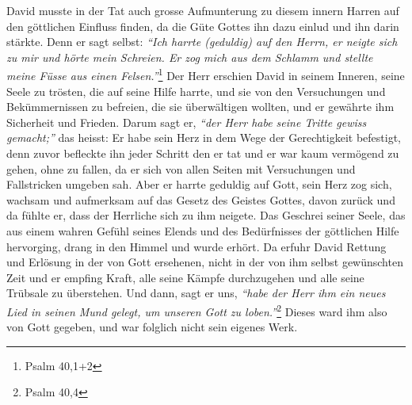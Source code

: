 David  musste in der Tat auch grosse Aufmunterung zu
diesem innern Harren
auf den göttlichen Einfluss finden, da die Güte Gottes ihn dazu einlud und ihn
darin stärkte. Denn er sagt selbst:
\textit{"`Ich harrte (geduldig) auf den Herrn,
er neigte sich zu mir und hörte mein Schreien. Er zog mich aus dem Schlamm und
stellte meine Füsse aus einen Felsen."'}\footnote{Psalm 40,1+2}
Der Herr
erschien David in seinem Inneren, seine Seele zu trösten, die auf
seine Hilfe
harrte, und sie von den Versuchungen und Bekümmernissen zu befreien, die sie
überwältigen wollten, und er gewährte ihm Sicherheit und Frieden. Darum sagt er,
\textit{"`der Herr habe seine Tritte gewiss gemacht;"'}
das heisst: Er habe sein Herz in
dem Wege der Gerechtigkeit befestigt, denn zuvor befleckte ihn jeder Schritt den
er tat und er war kaum vermögend zu gehen, ohne zu fallen, da er sich von
allen Seiten mit Versuchungen und Fallstricken umgeben sah. Aber er harrte
geduldig auf Gott, sein Herz zog sich, wachsam und aufmerksam auf das Gesetz des
Geistes Gottes, davon zurück und da fühlte er, dass der Herrliche sich zu ihm
neigete. Das Geschrei seiner Seele, das aus einem
wahren Gefühl seines Elends
und des Bedürfnisses der göttlichen Hilfe hervorging, drang in den Himmel und
wurde erhört. Da erfuhr David Rettung und Erlösung in der von Gott ersehenen,
nicht in der von ihm selbst gewünschten Zeit und er empfing Kraft, alle seine
Kämpfe durchzugehen und alle seine Trübsale zu überstehen. Und dann, sagt er
uns,
\textit{"`habe der Herr ihm ein neues Lied in seinen Mund gelegt, um unseren
Gott
zu loben."'}\footnote{Psalm 40,4}
Dieses ward ihm also von Gott gegeben, und war
folglich nicht sein eigenes Werk.

\medskip


